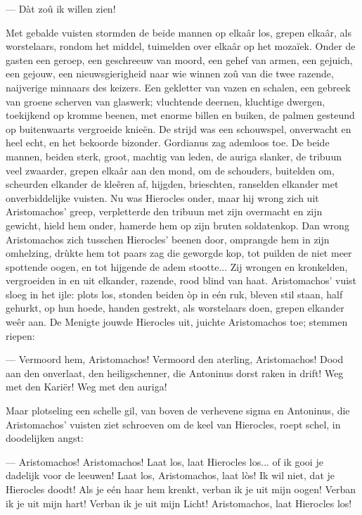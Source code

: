 \documentclass[a4paper, 12pt, oneside, dutch]{article}
\begin{document}
--- Dàt zoû ik willen zien!

Met gebalde vuisten stormden de beide mannen op elkaâr los, grepen elkaâr, als worstelaars, rondom het middel, tuimelden over elkaâr op het mozaïek. Onder de gasten een geroep, een geschreeuw van moord, een gehef van armen, een gejuich, een gejouw, een nieuwsgierigheid naar wie winnen zoû van die twee razende, naijverige minnaars des keizers. Een gekletter van vazen en schalen, een gebreek van groene scherven van glaswerk; vluchtende deernen, kluchtige dwergen, toekijkend op kromme beenen, met enorme billen en buiken, de palmen gesteund op buitenwaarts vergroeide knieën. De strijd was een schouwspel, onverwacht en heel echt, en het bekoorde bizonder. Gordianus zag ademloos toe. De beide mannen, beiden sterk, groot, machtig van leden, de auriga slanker, de tribuun veel zwaarder, grepen elkaâr aan den mond, om de schouders, buitelden om, scheurden elkander de kleêren af, hijgden, brieschten, ranselden elkander met onverbiddelijke vuisten. Nu was Hierocles onder, maar hij wrong zich uit Aristomachos' greep, verpletterde den tribuun met zijn overmacht en zijn gewicht, hield hem onder, hamerde hem op zijn bruten soldatenkop. Dan wrong Aristomachos zich tusschen Hierocles' beenen door, omprangde hem in zijn omhelzing, drùkte hem tot paars zag die geworgde kop, tot puilden de niet meer spottende oogen, en tot hijgende de adem stootte... Zij wrongen en kronkelden, vergroeiden in en uit elkander, razende, rood blind van haat. Aristomachos' vuist sloeg in het ijle: plots los, stonden beiden òp in eén ruk, bleven stil staan, half gehurkt, op hun hoede, handen gestrekt, als worstelaars doen, grepen elkander weêr aan. De Menigte jouwde Hierocles uit, juichte Aristomachos toe; stemmen riepen:

--- Vermoord hem, Aristomachos! Vermoord den aterling, Aristomachos! Dood aan den onverlaat, den heiligschenner, die Antoninus dorst raken in drift! Weg met den Kariër! Weg met den auriga!

Maar plotseling een schelle gil, van boven de verhevene sigma en Antoninus, die Aristomachos' vuisten ziet schroeven om de keel van Hierocles, roept schel, in doodelijken angst:

--- Aristomachos! Aristomachos! Laat los, laat Hierocles los... of ik gooi je dadelijk voor de leeuwen! Laat los, Aristomachos, laat lòs! Ik wil niet, dat je Hierocles doodt! Als je eén haar hem krenkt, verban ik je uit mijn oogen! Verban ik je uit mijn hart! Verban ik je uit mijn Licht! Aristomachos, laat Hierocles los!
\end{document}
